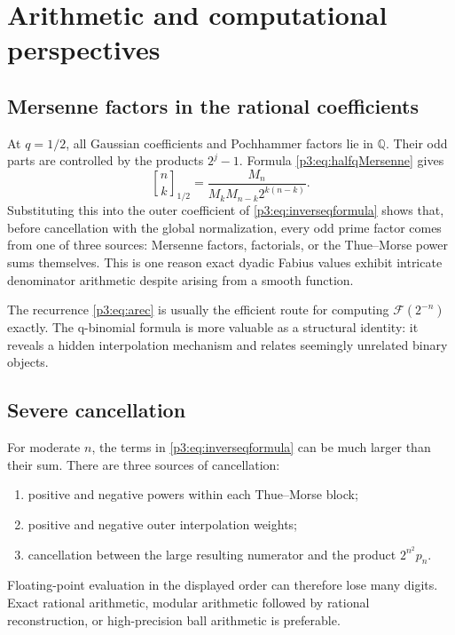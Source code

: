 \documentclass[11pt,oneside]{article}
\theoremstyle{definition}
\theoremstyle{remark}
\newcommand{\halfqbinom}[2]{{\genfrac{[}{]}{0pt}{}{#1}{#2}}_{1/2}}
\newcommand{\F}{\mathcal F}
\newcommand{\Q}{\mathbb Q}
\begin{document}
\section{Arithmetic and computational perspectives}
\label{p3:sec:computation}

\subsection{Mersenne factors in the rational coefficients}

At $q=1/2$, all Gaussian coefficients and Pochhammer factors lie in $\Q$.
Their odd parts are controlled by the products $2^j-1$.  Formula
\eqref{p3:eq:halfqMersenne} gives
\[
 \halfqbinom{n}{k}
 =\frac{M_n}{M_kM_{n-k}2^{k(n-k)}}.
\]
Substituting this into the outer coefficient of
\eqref{p3:eq:inverseqformula} shows that, before cancellation with the global
normalization, every odd prime factor comes from one of three sources:
Mersenne factors, factorials, or the Thue--Morse power sums themselves.
This is one reason exact dyadic Fabius values exhibit intricate denominator
arithmetic despite arising from a smooth function.

The recurrence \eqref{p3:eq:arec} is usually the efficient route for computing
$\F(2^{-n})$ exactly.  The q-binomial formula is more valuable as a
structural identity: it reveals a hidden interpolation mechanism and relates
seemingly unrelated binary objects.

\subsection{Severe cancellation}

For moderate $n$, the terms in \eqref{p3:eq:inverseqformula} can be much larger
than their sum.  There are three sources of cancellation:
\begin{enumerate}[leftmargin=2.2em]
\item positive and negative powers within each Thue--Morse block;
\item positive and negative outer interpolation weights;
\item cancellation between the large resulting numerator and the product
$2^{n^2}p_n$.
\end{enumerate}
Floating-point evaluation in the displayed order can therefore lose many
digits.  Exact rational arithmetic, modular arithmetic followed by rational
reconstruction, or high-precision ball arithmetic is preferable.
\end{document}
